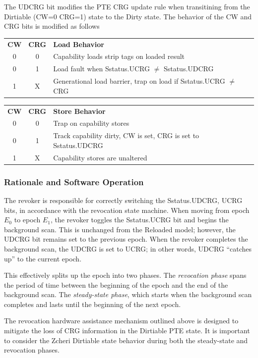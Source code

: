 The UDCRG bit modifies the PTE CRG update rule when transitining from the
Dirtiable (CW=0 CRG=1) state to the Dirty state.
The behavior of the CW and CRG bits is modified as follows
\begin{center}
  \begin{tabular}{ccl}
    \textbf{CW} & \textbf{CRG} & \textbf{Load Behavior} \\
    0 & 0 & Capability loads strip tags on loaded result \\
    0 & 1 & Load fault when Sstatus.UCRG $\neq$ Sstatus.UDCRG \\
    1 & X & Generational load barrier, trap on load if Sstatus.UCRG $\neq$ CRG \\
  \end{tabular}
  \begin{tabular}{ccl}
    \textbf{CW} & \textbf{CRG} & \textbf{Store Behavior} \\
    0 & 0 & Trap on capability stores \\
    0 & 1 & Track capability dirty, CW is set, CRG is set to Sstatus.UDCRG \\
    1 & X & Capability stores are unaltered \\
  \end{tabular}
\end{center}

\subsubsection{Rationale and Software Operation}
The revoker is responsible for correctly switching the Sstatus.{UDCRG, UCRG}
bits, in accordance with the revocation state machine.
When moving from epoch $E_0$ to epoch $E_1$, the revoker toggles the
Sstatus.UCRG bit and begins the background scan. This is unchanged from the
Reloaded model; however, the UDCRG bit remains set to the previous epoch.
When the revoker completes the background scan, the UDCRG is set to UCRG;
in other words, UDCRG ``catches up'' to the current epoch.

This effectively splits up the epoch into two phases. The \textit{revocation%
  phase} spans the period of time between the beginning of the epoch and the
end of the background scan. The \textit{steady-state phase}, which starts when
the background scan completes and lasts until the beginning of the next epoch.

The revocation hardware assistance mechanism outlined above is designed to
mitigate the loss of CRG information in the Dirtiable PTE state.
It is important to consider the Zcheri Dirtiable state behavior during both
the steady-state and revocation phases.

